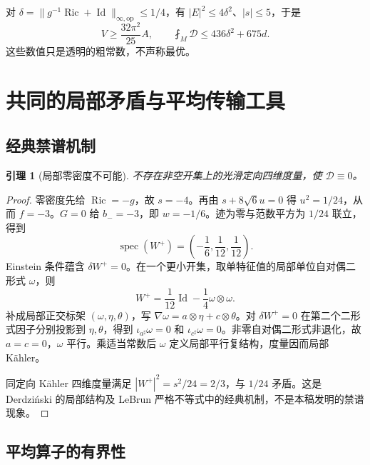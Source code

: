 \documentclass[UTF8,fontset=fandol,zihao=-4]{ctexart}
\theoremstyle{cn}
\newtheorem{lemma}[theorem]{引理}
\DeclareMathOperator{\Ric}{Ric}
\DeclareMathOperator{\Id}{Id}
\newcommand{\op}{\mathrm{op}}
\newcommand{\av}{\fint}
\newcommand{\Dcal}{\mathcal D}
\numberwithin{equation}{section}
\begin{document}
对 $\delta=\|g^{-1}\Ric+\Id\|_{\infty,\op}\le1/4$，有 $|E|^2\le4\delta^2$、$|s|\le5$，于是
\begin{equation}\label{eq:delta-budget}
V\ge\frac{32\pi^2}{25}A,\qquad
\boxed{\av_M\Dcal\le436\delta^2+675d.}
\end{equation}
这些数值只是透明的粗常数，不声称最优。

\section{共同的局部矛盾与平均传输工具}

\subsection{经典禁谱机制}

\begin{lemma}[局部零密度不可能]\label{lem:forbidden}
不存在非空开集上的光滑定向四维度量，使 $\Dcal\equiv0$。
\end{lemma}
\begin{proof}
零密度先给 $\Ric=-g$，故 $s=-4$。再由 $s+8\sqrt6u=0$ 得 $u^2=1/24$，从而 $f=-3$。$G=0$ 给 $b_-=-3$，即 $w=-1/6$。迹为零与范数平方为 $1/24$ 联立，得到
\begin{equation}\label{eq:forbidden-spectrum}
\operatorname{spec}(W^+)=\left(-\frac16,\frac1{12},\frac1{12}\right).
\end{equation}
Einstein 条件蕴含 $\delta W^+=0$。在一个更小开集，取单特征值的局部单位自对偶二形式 $\omega$，则
\[
W^+=\frac1{12}\Id-\frac14\omega\otimes\omega.
\]
补成局部正交标架 $(\omega,\eta,\theta)$，写 $\nabla\omega=a\otimes\eta+c\otimes\theta$。对 $\delta W^+=0$ 在第二个二形式因子分别投影到 $\eta,\theta$，得到 $\iota_{a^\sharp}\omega=0$ 和 $\iota_{c^\sharp}\omega=0$。非零自对偶二形式非退化，故 $a=c=0$，$\omega$ 平行。乘适当常数后 $\omega$ 定义局部平行复结构，度量因而局部 Kähler。

同定向 Kähler 四维度量满足 $|W^+|^2=s^2/24=2/3$，与 $1/24$ 矛盾。这是 Derdziński 的局部结构及 LeBrun 严格不等式中的经典机制\cite{derd,lebrun2004}，不是本稿发明的禁谱现象。
\end{proof}

\subsection{平均算子的有界性}
\end{document}
